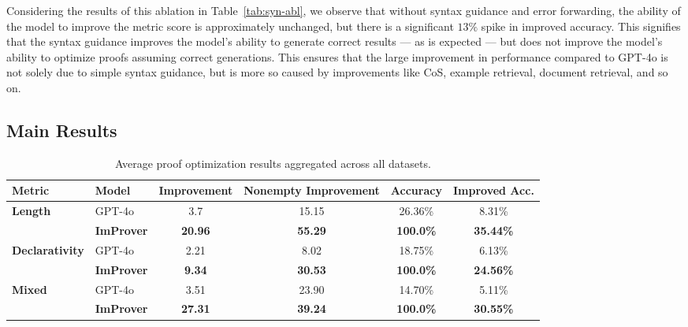Considering the results of this ablation in Table~\ref{tab:syn-abl}, we observe that without syntax guidance and error forwarding, the ability of the model to improve the metric score is approximately unchanged, but there is a significant $13\%$ spike in improved accuracy. This signifies that the syntax guidance improves the model's ability to generate correct results --- as is expected --- but does not improve the model's ability to optimize proofs assuming correct generations. This ensures that the large improvement in performance compared to GPT-4o is not solely due to simple syntax guidance, but is more so caused by improvements like CoS, example retrieval, document retrieval, and so on.

\subsection{Main Results}
\label{sec:improver_results}

\begin{table}[t]
\caption{Average proof optimization results aggregated across all datasets.}
\label{tab:main-avg}
\centering
\small
\begin{tabular}{ll|cccc}
\toprule
Metric & Model & Improvement & Nonempty Improvement & Accuracy & Improved Acc.\\
\midrule
\multirow{2}{*}{\textbf{Length}} & GPT-4o & 3.7 & 15.15 & 26.36\% & 8.31\% \\
 & \textbf{ImProver} & \textbf{20.96} & \textbf{55.29} & \textbf{100.0\%} & \textbf{35.44\%} \\
\midrule
\multirow{2}{*}{\textbf{Declarativity}} & GPT-4o & 2.21 & 8.02 & 18.75\% & 6.13\% \\
 & \textbf{ImProver} & \textbf{9.34} & \textbf{30.53} & \textbf{100.0\%} & \textbf{24.56\%} \\
\midrule
\multirow{2}{*}{\textbf{Mixed}} & GPT-4o & 3.51 & 23.90 & 14.70\% & 5.11\% \\
 & \textbf{ImProver} & \textbf{27.31} & \textbf{39.24} & \textbf{100.0\%} & \textbf{30.55\%} \\
\bottomrule
\end{tabular}
\end{table}

